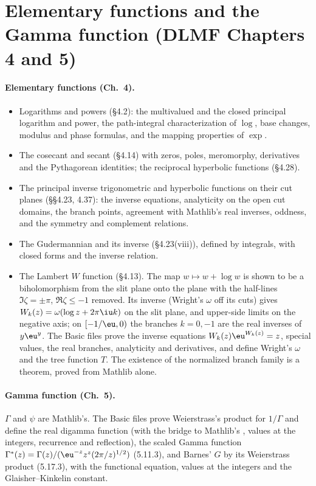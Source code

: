 \documentclass[11pt,a4paper]{article}
\begin{document}
\section{Elementary functions and the Gamma function (DLMF Chapters 4 and 5)}

\paragraph{Elementary functions (Ch.~4).}
\begin{itemize}
  \item Logarithms and powers (\S4.2): the multivalued and the closed principal logarithm
    and power, the path-integral characterization of $\log$, base changes, modulus and phase
    formulas, and the mapping properties of $\exp$.
  \item The cosecant and secant (\S4.14) with zeros, poles, meromorphy, derivatives and the
    Pythagorean identities; the reciprocal hyperbolic functions (\S4.28).
  \item The principal inverse trigonometric and hyperbolic functions on their cut planes
    (\S\S4.23, 4.37): the inverse equations, analyticity on the open cut domains, the branch
    points, agreement with Mathlib's real inverses, oddness, and the symmetry and complement
    relations.
  \item The Gudermannian and its inverse (\S4.23(viii)), defined by integrals, with closed
    forms and the inverse relation.
  \item The Lambert $W$ function (\S4.13). The map $w\mapsto w+\log w$ is shown to be a
    biholomorphism from the slit plane onto the plane with the half-lines
    $\Im\zeta=\pm\pi$, $\Re\zeta\le-1$ removed. Its inverse (Wright's $\omega$ off its cuts)
    gives $W_k(z)=\omega(\log z+2\pi\iu k)$ on the slit plane, and upper-side limits on the
    negative axis; on $[-1/\eu,0)$ the branches $k=0,-1$ are the real inverses of $y\eu^y$.
    The Basic files prove the inverse equations $W_k(z)\eu^{W_k(z)}=z$, special values, the
    real branches, analyticity and derivatives, and define Wright's $\omega$ and the tree
    function $T$. The existence of the normalized branch family is a theorem, proved from
    Mathlib alone.
\end{itemize}

\paragraph{Gamma function (Ch.~5).} $\Gamma$ and $\psi$ are Mathlib's. The Basic files prove
Weierstrass's product for $1/\Gamma$ and define the real digamma function
 (with the bridge to Mathlib's , values at the integers, recurrence and reflection), the scaled Gamma
function $\Gamma^*(z)=\Gamma(z)/(\eu^{-z}z^z(2\pi/z)^{1/2})$ (5.11.3), and Barnes' $G$ by its
Weierstrass product (5.17.3), with the functional equation, values at the integers and the
Glaisher--Kinkelin constant.
\end{document}
